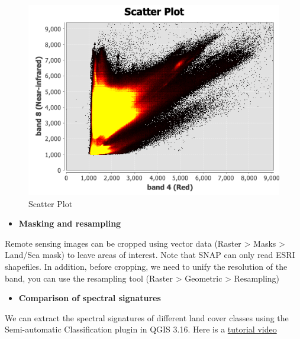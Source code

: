 \documentclass[
  letterpaper,
  DIV=11,
  numbers=noendperiod]{scrreprt}
\providecommand{\tightlist}{%
  \setlength{\itemsep}{0pt}\setlength{\parskip}{0pt}}\usepackage{longtable,booktabs,array}
\begin{document}
\begin{figure}

{\centering \includegraphics{./image/scatterplot.png}

}

\caption{Scatter Plot}

\end{figure}

\begin{itemize}
\tightlist
\item
  \textbf{Masking and resampling}
\end{itemize}

Remote sensing images can be cropped using vector data (Raster
\textgreater{} Masks \textgreater{} Land/Sea mask) to leave areas of
interest. Note that SNAP can only read ESRI shapefiles. In addition,
before cropping, we need to unify the resolution of the band, you can
use the resampling tool (Raster \textgreater{} Geometric \textgreater{}
Resampling)

\begin{itemize}
\tightlist
\item
  \textbf{Comparison of spectral signatures}
\end{itemize}

We can extract the spectral signatures of different land cover classes
using the Semi-automatic Classification plugin in QGIS 3.16. Here is a
\href{https://www.youtube.com/watch?v=Myd-rgxRTfI}{tutorial video}
\end{document}
